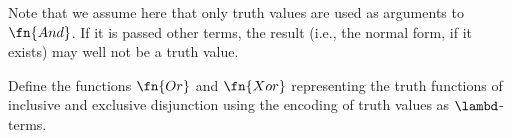 \documentclass[../../../include/open-logic-section]{subfiles}
\begin{document}
Note that we assume here that only truth values are used as arguments
to $\fn{And}$. If it is passed other terms, the result (i.e., the
normal form, if it exists) may well not be a truth value.

\begin{prob}
  Define the functions $\fn{Or}$ and $\fn{Xor}$ representing the truth
  functions of inclusive and exclusive disjunction using the encoding
  of truth values as $\lambd$-terms.
\end{prob}
\end{document}
